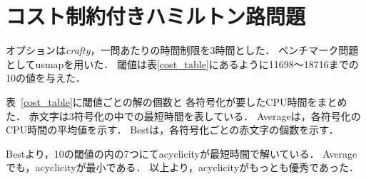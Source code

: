\section{コスト制約付きハミルトン路問題}


オプションは\textit{crafty}，一問あたりの時間制限を3時間とした．
ベンチマーク問題として\textsf{usmap}を用いた．
閾値は表\ref{cost_table}にあるように11698〜18716までの10の値を与えた．

表~\ref{cost_table}に閾値ごとの解の個数と
各符号化が要したCPU時間をまとめた．
赤文字は3符号化の中での最短時間を表している．
Averageは，各符号化のCPU時間の平均値を示す．
Bestは，各符号化ごとの赤文字の個数を示す．

Bestより，10の閾値の内の7つにて\textsf{acyclicity}が最短時間で解いている．
Averageでも，\textsf{acyclicity}が最小である．
以上より，\textsf{acyclicity}がもっとも優秀であった．

